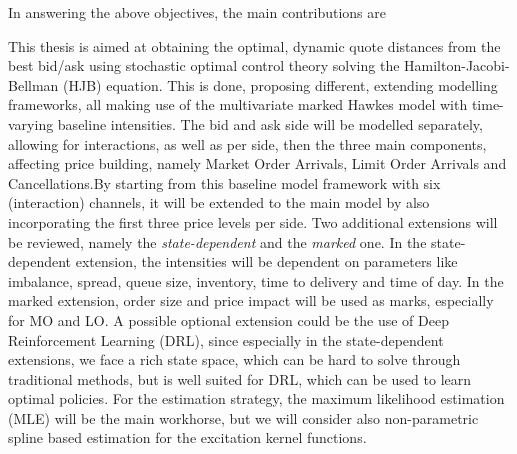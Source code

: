 \documentclass[12pt,a4paper]{cau_thesis}
\begin{document}
In answering the above objectives, the main contributions are

This thesis is aimed at obtaining the optimal, dynamic quote
distances from the best bid/ask using stochastic optimal control
theory solving the Hamilton-Jacobi-Bellman (HJB) equation. This is
done, proposing different, extending modelling frameworks, all making
use of the multivariate marked Hawkes model with time-varying
baseline intensities. The bid and ask side will be modelled
separately, allowing for interactions, as well as per side, then the
three main components, affecting price building, namely Market Order
Arrivals, Limit Order Arrivals and Cancellations.By starting from
this baseline model framework with six (interaction) channels, it
will be extended to the main model by also incorporating the first
three price levels per side. Two additional extensions will be
reviewed, namely the \textit{state-dependent} and the \textit{marked}
one. In the state-dependent extension, the intensities will be
dependent on parameters like imbalance, spread, queue size,
inventory, time to delivery and time of day. In the marked extension,
order size and price impact will be used as marks, especially for MO
and LO. A possible optional extension could be the use of Deep
Reinforcement Learning (DRL), since especially in the state-dependent
extensions, we face a rich state space, which can be hard to solve
through traditional methods, but is well suited for DRL, which can be
used to learn optimal policies. For the estimation strategy, the
maximum likelihood estimation (MLE) will be the main workhorse, but
we will consider also non-parametric spline based estimation for the
excitation kernel functions.
\end{document}
